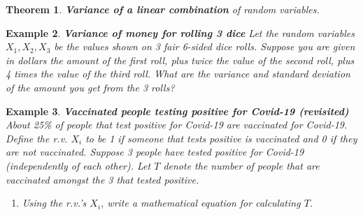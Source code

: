 \documentclass[12pt]{amsart}
\newtheorem{theorem}{Theorem}[section]
\newtheorem{example}[theorem]{Example}
\begin{document}
{\begin{theorem}{\textbf{Variance of a linear combination} of random variables.}
\end{theorem}

\begin{example}  \textbf{Variance of money for rolling 3 dice} \newline
Let the random variables $X_1, X_2, X_3$ be the values shown on 3 fair 6-sided dice rolls. \newline 
Suppose you are given in dollars the amount of the first roll, plus twice the value of the second roll, plus 4 times the value of the third roll. \newline 
What are the variance and standard deviation of the amount you get from the 3 rolls?  \newline 



\end{example} 





 \newpage

\begin{example}\label{VaccBinom}  \textbf{Vaccinated people testing positive for Covid-19 (revisited)} \newline
About 25\% of people that test positive for Covid-19 are vaccinated for Covid-19.\newline
Define the r.v. $X_i$ to be 1 if someone that tests positive is vaccinated and 0 if they are not vaccinated. \newline
Suppose 3 people have tested positive for Covid-19 (independently of each other). \newline
Let $T$ denote the number of people that are vaccinated amongst the 3 that tested positive.


\begin{enumerate}
\item Using the r.v.'s $X_i$, write a mathematical equation for calculating $T$.


\end{enumerate}
\end{example}}
\end{document}

